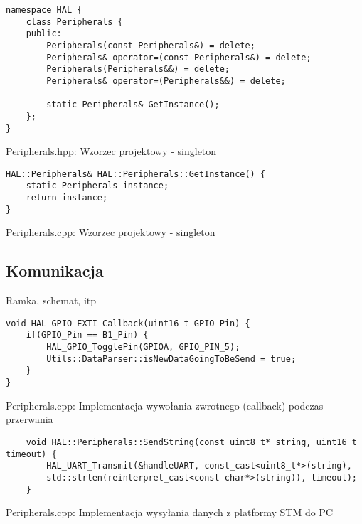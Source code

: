 \begin{listing}[htb]
\begin{verbatim}
namespace HAL {
    class Peripherals {
    public:
        Peripherals(const Peripherals&) = delete;
        Peripherals& operator=(const Peripherals&) = delete;
        Peripherals(Peripherals&&) = delete;
        Peripherals& operator=(Peripherals&&) = delete;

        static Peripherals& GetInstance();
    };
}
\end{verbatim}
\caption{Peripherals.hpp: Wzorzec projektowy - singleton}
\label{lst:singleton_hpp`}
\end{listing}

\begin{listing}[htb]
\begin{verbatim}
HAL::Peripherals& HAL::Peripherals::GetInstance() {
    static Peripherals instance;
    return instance;
}
\end{verbatim}
\caption{Peripherals.cpp: Wzorzec projektowy - singleton}
\label{lst:singleton_cpp}
\end{listing}

\subsection{Komunikacja} \label{sec:uart}
Ramka, schemat, itp
\begin{listing}[htb]
\begin{verbatim}
void HAL_GPIO_EXTI_Callback(uint16_t GPIO_Pin) {
    if(GPIO_Pin == B1_Pin) {
        HAL_GPIO_TogglePin(GPIOA, GPIO_PIN_5);
        Utils::DataParser::isNewDataGoingToBeSend = true;
    }
}
\end{verbatim}
\caption{Peripherals.cpp: Implementacja wywołania zwrotnego (callback) podczas przerwania}
\label{lst:callback_cpp}
\end{listing}

\begin{listing}[htb]
\begin{verbatim}
    void HAL::Peripherals::SendString(const uint8_t* string, uint16_t timeout) {
        HAL_UART_Transmit(&handleUART, const_cast<uint8_t*>(string),
        std::strlen(reinterpret_cast<const char*>(string)), timeout);
    }
    \end{verbatim}
    \caption{Peripherals.cpp: Implementacja wysyłania danych z platformy STM do PC}
    \label{lst:sendstring_cpp}
\end{listing}

